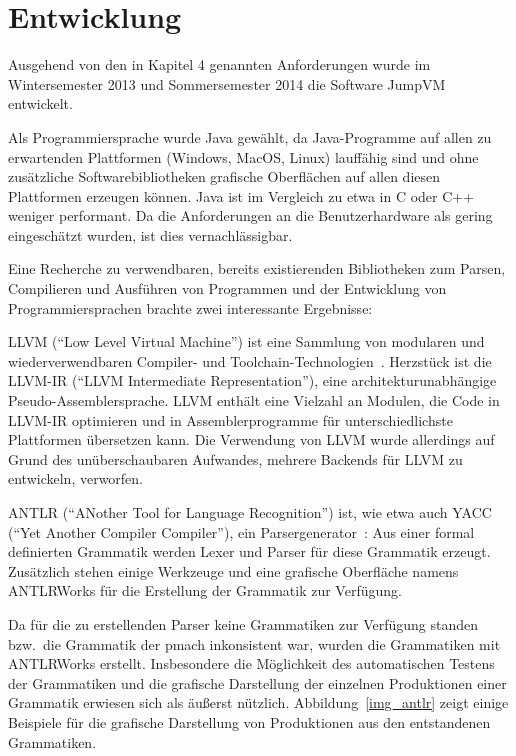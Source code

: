 \documentclass[german, a4paper, parskip, bibliography=totoc]{scrartcl}
\begin{document}
\section{Entwicklung}
Ausgehend von den in Kapitel 4 genannten Anforderungen wurde im Wintersemester
2013 und Sommersemester 2014 die Software JumpVM entwickelt.

Als Programmiersprache wurde Java gewählt, da Java-Programme auf allen zu
erwartenden Plattformen (Windows, MacOS, Linux) lauffähig sind und ohne
zusätzliche Softwarebibliotheken grafische Oberflächen auf allen diesen
Plattformen erzeugen können. Java ist im Vergleich zu etwa in C oder C++
weniger performant. Da die Anforderungen an die Benutzerhardware als gering
eingeschätzt wurden, ist dies vernachlässigbar.

Eine Recherche zu verwendbaren, bereits existierenden Bibliotheken zum Parsen,
Compilieren und Ausführen von Programmen und der Entwicklung von
Programmiersprachen brachte zwei interessante Ergebnisse:

LLVM (\enquote{Low Level Virtual Machine}) ist eine Sammlung von modularen und
wiederverwendbaren Compiler- und Toolchain-Technologien~\cite{url_llvm}.
Herzstück ist die LLVM-IR (\enquote{LLVM Intermediate Representation}), eine
architekturunabhängige Pseudo-Assem\-blersprache. LLVM enthält eine Vielzahl an
Modulen, die Code in LLVM-IR optimieren und in Assemblerprogramme für
unterschiedlichste Plattformen übersetzen kann. Die Verwendung von LLVM wurde
allerdings auf Grund des unüberschaubaren Aufwandes, mehrere Backends für
LLVM zu entwickeln, verworfen.

ANTLR (\enquote{ANother Tool for Language Recognition}) ist, wie etwa auch
YACC (\enquote{Yet Another Compiler Compiler}), ein
Parsergenerator~\cite{url_antlr}: Aus einer formal definierten Grammatik werden
Lexer und Parser für diese Grammatik erzeugt. Zusätzlich stehen einige
Werkzeuge und eine grafische Oberfläche namens ANTLRWorks für die
Erstellung der Grammatik zur Verfügung.

Da für die zu erstellenden Parser keine Grammatiken zur Verfügung standen
bzw.\ die Grammatik der pmach inkonsistent war, wurden die Grammatiken mit
ANTLRWorks erstellt. Insbesondere die Möglichkeit des automatischen Testens
der Grammatiken und die grafische Darstellung der einzelnen Produktionen einer
Grammatik erwiesen sich als äußerst nützlich. Abbildung~\ref{img_antlr} zeigt
einige Beispiele für die grafische Darstellung von Produktionen aus den
entstandenen Grammatiken.
\end{document}
